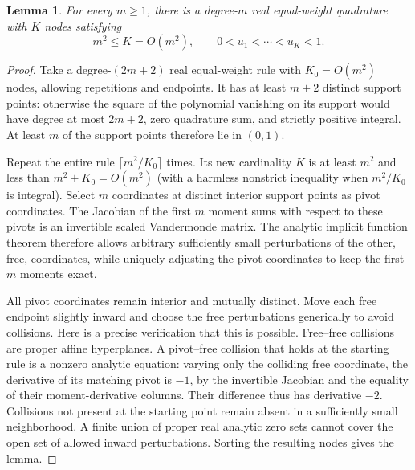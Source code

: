 \documentclass[11pt]{article}
\newtheorem{lemma}[theorem]{Lemma}
\begin{document}
\begin{lemma}\label{lem:regular}
For every $m\geq1$, there is a degree-$m$ real equal-weight quadrature
with $K$ nodes satisfying
\[
 m^2\leq K=O(m^2),\qquad 0<u_1<\cdots<u_K<1.
\]
\end{lemma}
\begin{proof}
Take a degree-$(2m+2)$ real equal-weight rule with $K_0=O(m^2)$ nodes,
allowing repetitions and endpoints. It has at least $m+2$ distinct support
points: otherwise the square of the polynomial vanishing on its support
would have degree at most $2m+2$, zero quadrature sum, and strictly positive
integral. At least $m$ of the support points therefore lie in $(0,1)$.

Repeat the entire rule $\lceil m^2/K_0\rceil$ times. Its new cardinality
$K$ is at least $m^2$ and less than $m^2+K_0=O(m^2)$ (with a harmless
nonstrict inequality when $m^2/K_0$ is integral). Select $m$ coordinates at
distinct interior support points as pivot coordinates. The Jacobian of the
first $m$ moment sums with respect to these pivots is an invertible scaled
Vandermonde matrix. The analytic implicit function theorem therefore
allows arbitrary sufficiently small perturbations of the other, free,
coordinates, while uniquely adjusting the pivot coordinates to keep the
first $m$ moments exact.

All pivot coordinates remain interior and mutually distinct. Move each free
endpoint slightly inward and choose the free perturbations generically to
avoid collisions. Here is a precise verification that this is possible.
Free--free collisions are proper affine hyperplanes. A pivot--free collision
that holds at the starting rule is a nonzero analytic equation: varying only
the colliding free coordinate, the derivative of its matching pivot is $-1$,
by the invertible Jacobian and the equality of their moment-derivative
columns. Their difference thus has derivative $-2$. Collisions not present
at the starting point remain absent in a sufficiently small neighborhood.
A finite union of proper real analytic zero sets cannot cover the open set
of allowed inward perturbations. Sorting the resulting nodes gives the lemma.
\end{proof}
\end{document}

